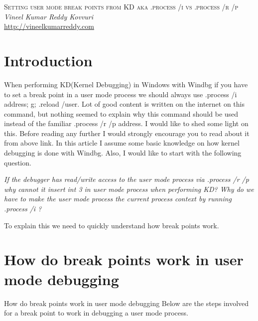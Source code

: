 \documentclass{article}
\begin{document}
\begin{titlepage}
   \begin{center}
      \Large\textsc{Setting user mode break points from KD aka .process /i vs .process /r /p}\\
      \vspace{5mm}
      \Large\textit{Vineel Kumar Reddy Kovvuri}\\
      \url{http://vineelkumarreddy.com}\\
   \end{center}
\end{titlepage}

\tableofcontents

\newpage
\section{Introduction}
When performing KD(Kernel Debugging) in Windows with Windbg if you have to set a break point in a user mode process we should always use .process /i address; g; .reload /user. Lot of good content is written on the internet on this command, but nothing seemed to explain why this command should be used instead of the familiar .process /r /p address. I would like to shed some light on this. Before reading any further I would strongly encourage you to read about it from above link. In this article I assume some basic knowledge on how kernel debugging is done with Windbg. Also, I would like to start with the following question.

\textit{If the debugger has read/write access to the user mode process via .process /r /p why cannot it insert int 3 in user mode process when performing KD? Why do we have to make the user mode process the current process context by running .process /i ?}

To explain this we need to quickly understand how break points work.


\section{How do break points work in user mode debugging}
How do break points work in user mode debugging
Below are the steps involved for a break point to work in debugging a user mode process.
\end{document}
